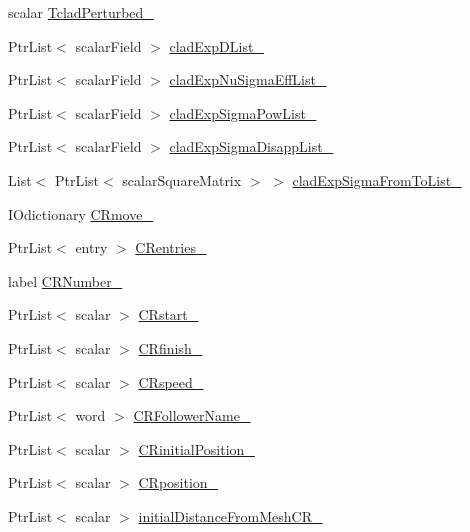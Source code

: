 \begin{DoxyCompactItemize}
scalar \hyperlink{classFoam_1_1XSLowMem_a0c6ce4615de673dc1b394551383a4306}{Tclad\+Perturbed\+\_\+}
\item 
Ptr\+List$<$ scalar\+Field $>$ \hyperlink{classFoam_1_1XSLowMem_ae03abbd2301246ee28d49d2308db30d1}{clad\+Exp\+D\+List\+\_\+}
\item 
Ptr\+List$<$ scalar\+Field $>$ \hyperlink{classFoam_1_1XSLowMem_aff0842a57f719497e0b218011a9f2bb7}{clad\+Exp\+Nu\+Sigma\+Eff\+List\+\_\+}
\item 
Ptr\+List$<$ scalar\+Field $>$ \hyperlink{classFoam_1_1XSLowMem_ae912b858880f1eab676702606d27daca}{clad\+Exp\+Sigma\+Pow\+List\+\_\+}
\item 
Ptr\+List$<$ scalar\+Field $>$ \hyperlink{classFoam_1_1XSLowMem_a431532a3f51fc5c0b3f6c2dacf9eaf15}{clad\+Exp\+Sigma\+Disapp\+List\+\_\+}
\item 
List$<$ Ptr\+List$<$ scalar\+Square\+Matrix $>$ $>$ \hyperlink{classFoam_1_1XSLowMem_ae08aea5cb35d13155b6500359220a610}{clad\+Exp\+Sigma\+From\+To\+List\+\_\+}
\item 
I\+Odictionary \hyperlink{classFoam_1_1XSLowMem_a29c44ad7cad96a26dabbceeb7e4726eb}{C\+Rmove\+\_\+}
\item 
Ptr\+List$<$ entry $>$ \hyperlink{classFoam_1_1XSLowMem_a3db65236cfa499f3d1af3a6d138b901b}{C\+Rentries\+\_\+}
\item 
label \hyperlink{classFoam_1_1XSLowMem_aca1bc9cd45aa65bba5648dfef95f3ade}{C\+R\+Number\+\_\+}
\item 
Ptr\+List$<$ scalar $>$ \hyperlink{classFoam_1_1XSLowMem_ae701fac84afdd0314da1c5afd8167c0b}{C\+Rstart\+\_\+}
\item 
Ptr\+List$<$ scalar $>$ \hyperlink{classFoam_1_1XSLowMem_a95fdbf3240e83a55b03524b573c4d004}{C\+Rfinish\+\_\+}
\item 
Ptr\+List$<$ scalar $>$ \hyperlink{classFoam_1_1XSLowMem_a65e78652b96aa06c69280257ca9aa536}{C\+Rspeed\+\_\+}
\item 
Ptr\+List$<$ word $>$ \hyperlink{classFoam_1_1XSLowMem_a8179271f63974b5ee1ca293495877e9f}{C\+R\+Follower\+Name\+\_\+}
\item 
Ptr\+List$<$ scalar $>$ \hyperlink{classFoam_1_1XSLowMem_a8d008d308ad81906d031bf59ee715e3b}{C\+Rinitial\+Position\+\_\+}
\item 
Ptr\+List$<$ scalar $>$ \hyperlink{classFoam_1_1XSLowMem_a40a7dacaf9eb33f6bde0de0da08f30de}{C\+Rposition\+\_\+}
\item 
Ptr\+List$<$ scalar $>$ \hyperlink{classFoam_1_1XSLowMem_a950f9c7de67d1956bd963be294a6ab4e}{initial\+Distance\+From\+Mesh\+C\+R\+\_\+}
\end{DoxyCompactItemize}


